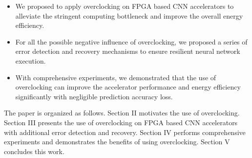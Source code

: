 \begin{itemize}
	\item We proposed to apply overclocking on FPGA based CNN accelerators 
		to alleviate the stringent computing bottleneck and improve the 
		overall energy efficiency. 

	\item For all the possible negative influence of 
		overclocking, we proposed a series of error detection 
		and recovery mechanisms to ensure resilient neural network execution. 

	\item With comprehensive experiments, we demonstrated that the use 
		of overclocking can improve the accelerator performance and energy 
		efficiency significantly with negligible prediction accuracy loss.
\end{itemize}

The paper is organized as follows. Section II motivates the use of overclocking. 
Section III presents the use of overclocking on FPGA based CNN 
accelerators with additional error detection and recovery. 
Section IV performs comprehensive experiments and demonstrates the benefits 
of using overclocking. Section V concludes this work. 


